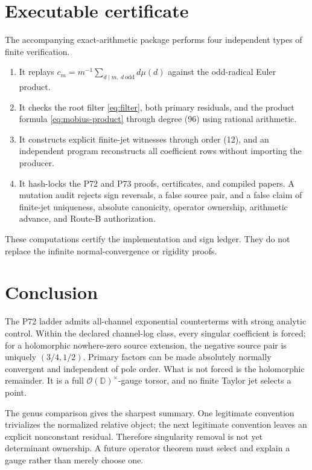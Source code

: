 \documentclass[11pt]{article}
\newcommand{\D}{\mathbb D}
\newcommand{\Ohol}{\mathcal O}
\begin{document}
\section{Executable certificate}

The accompanying exact-arithmetic package performs four independent types
of finite verification.
\begin{enumerate}
 \item It replays
 \(c_m=m^{-1}\sum_{d\mid m,\ d\ \text{odd}}d\mu(d)\) against the odd-radical
 Euler product.
 \item It checks the root filter \cref{eq:filter}, both primary residuals, and
 the product formula \cref{eq:mobius-product} through degree (96) using
 rational arithmetic.
 \item It constructs explicit finite-jet witnesses through order (12), and
 an independent program reconstructs all coefficient rows without importing
 the producer.
 \item It hash-locks the P72 and P73 proofs, certificates, and compiled
 papers.  A mutation audit rejects sign reversals, a false source pair, and a false claim of
 finite-jet uniqueness, absolute canonicity, operator ownership, arithmetic
 advance, and Route-B authorization.
\end{enumerate}
These computations certify the implementation and sign ledger.  They do not
replace the infinite normal-convergence or rigidity proofs.

\section{Conclusion}

The P72 ladder admits all-channel exponential counterterms with strong
analytic control.  Within the declared channel-log class, every singular
coefficient is forced; for a holomorphic nowhere-zero source extension, the
negative source pair is uniquely \((3/4,1/2)\).  Primary factors can be made absolutely normally
convergent and independent of pole order.  What is not forced is the
holomorphic remainder.  It is a full \(\Ohol(\D)^\times\)-gauge torsor, and
no finite Taylor jet selects a point.

The genus comparison gives the sharpest summary.  One legitimate convention
trivializes the normalized relative object; the next legitimate convention
leaves an explicit nonconstant residual.  Therefore singularity removal is
not yet determinant ownership.  A future operator theorem must select and
explain a gauge rather than merely choose one.
\end{document}

